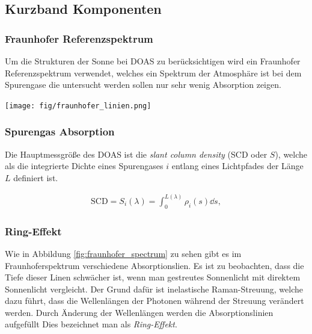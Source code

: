 \documentclass[12pt, a4paper, bibliography=totoc]{scrartcl}
\begin{document}
\begin{multicols}{2}
\subsection{Kurzband Komponenten}\label{ssec:Kurzband}

\subsubsection{Fraunhofer Referenzspektrum}\label{sssec:fraunhofer_reference}

Um die Strukturen der Sonne bei DOAS zu berücksichtigen wird ein Fraunhofer Referenzspektrum verwendet, welches ein Spektrum der Atmosphäre ist bei dem Spurengase die untersucht werden sollen nur sehr wenig Absorption zeigen.

\begin{center}
    \texttt{[image: fig/fraunhofer\_linien.png]}
    \label{fig:fraunhofer_spectrum}
\end{center}



\subsubsection{Spurengas Absorption}\label{sssec:trace_gas_absorption}

Die Hauptmessgröße des DOAS ist die \textit{slant column density} (SCD oder $S$),
welche als die integrierte Dichte eines Spurengases $i$ entlang eines Lichtpfades der Länge $L$ definiert ist.
    
\begin{align}
    \text{SCD} = S_i (\lambda) = \int_0^{L(\lambda)} \rho_i (s) \dd s ,\label{eq:SCD}
\end{align}

\subsubsection{Ring-Effekt}

Wie in Abbildung \ref{fig:fraunhofer_spectrum} zu sehen gibt es im Fraunhoferspektrum verschiedene Absorptionslien.
Es ist zu beobachten, dass die Tiefe dieser Linen schwächer ist, wenn man gestreutes Sonnenlicht mit direktem Sonnenlicht vergleicht.
Der Grund dafür ist inelastische Raman-Streuung, welche dazu führt, dass die Wellenlängen der Photonen während der Streuung verändert werden.
Durch Änderung der Wellenlängen werden die Absorptionslinien aufgefüllt
Dies bezeichnet man als \textit{Ring-Effekt}.


\end{multicols}
\end{document}
